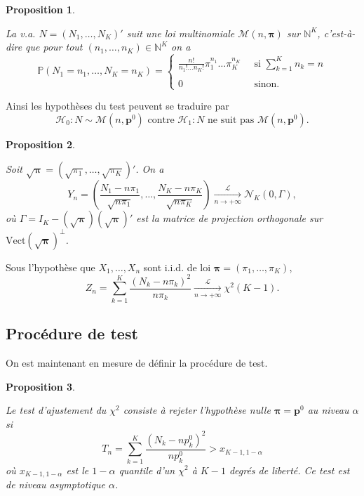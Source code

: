 \documentclass[
]{book}
\newtheorem{proposition}{Proposition}[chapter]
\theoremstyle{definition}
\theoremstyle{definition}
\theoremstyle{definition}
\theoremstyle{definition}
\theoremstyle{remark}
\begin{document}
\begin{proposition}
\protect\hypertarget{prp:unlabeled-div-42}{}\label{prp:unlabeled-div-42}

La v.a. \(N=(N_{1},\ldots,N_{K})'\) suit une loi multinomiale
\(\mathcal{M}(n,\boldsymbol{\pi})\) sur \(\mathbb{N}^K\), c'est-à-dire que pour tout \((n_1,\ldots,n_K)\in \mathbb{N}^K\) on a
\[
\mathbb{P}(N_{1}=n_1,\ldots,N_{K}=n_K)=\left\{
  \begin{array}{cl}
\frac{n!}{n_1!\ldots n_K!} \pi_1^{n_1}\ldots \pi_K^{n_K}& \ \mbox{ si } \sum_{k=1}^K n_k=n\\
\\
0 &  \ \mbox{ sinon. }
  \end{array}
\right.
\]

\end{proposition}

Ainsi les hypothèses du test peuvent se traduire par
\[
\mathcal{H}_0 : N \sim \mathcal M (n,\mathbf{p}^0) \textrm{ contre } \mathcal{H}_1 : N \textrm{ ne suit pas } \mathcal M(n,\mathbf{p}^0).
\]

\begin{proposition}
\protect\hypertarget{prp:unlabeled-div-43}{}\label{prp:unlabeled-div-43}

Soit \(\sqrt{\boldsymbol{\pi}}=\left(\sqrt{\pi_1},\ldots,\sqrt{\pi_K}\right)'\). On a
\[Y_n=\left(\frac{N_{1}-n \pi_1}{\sqrt{n \pi_1}},\ldots,\frac{N_{K}-n \pi_K}{\sqrt{n \pi_K}}\right) \underset{n\rightarrow +\infty}{\stackrel{\mathcal L}{\longrightarrow}} \mathcal{N}_K\left(0,\Gamma\right),\]
où \(\Gamma= I_K - (\sqrt{\boldsymbol{\pi}}) (\sqrt{\boldsymbol{\pi}})'\) est la matrice de projection orthogonale sur \(\mbox{Vect}(\sqrt{\boldsymbol{\pi}})^{\perp}\).

\end{proposition}

Sous l'hypothèse que \(X_1,\ldots, X_n\) sont i.i.d. de loi \(\boldsymbol{\pi}=(\pi_1,\ldots,\pi_K)\),
\[Z_n=\sum_{k=1}^K \frac{\left(N_{k}-n \pi_k\right)^2}{n \pi_k} \underset{n\rightarrow +\infty}{\stackrel{\mathcal L}{\longrightarrow}} \chi^2(K-1).\]

\hypertarget{procuxe9dure-de-test-1}{%
\subsection{Procédure de test}\label{procuxe9dure-de-test-1}}

On est maintenant en mesure de définir la procédure de test.

\begin{proposition}
\protect\hypertarget{prp:unlabeled-div-44}{}\label{prp:unlabeled-div-44}

Le test d'ajustement du \(\chi^2\) consiste à rejeter l'hypothèse nulle
\(\boldsymbol{\pi}= \mathbf{p}^0\) au niveau \(\alpha\) si
\[T_{n}= \sum_{k=1}^K \frac{\left(N_{k}-n p^0_k\right)^2}{n p^0_k} >x_{K-1,1-\alpha}\]
où \(x_{K-1,1-\alpha}\) est le \(1-\alpha\) quantile d'un \(\chi^2\) à \(K-1\) degrés de liberté.
Ce test est de niveau asymptotique \(\alpha\).

\end{proposition}
\end{document}
